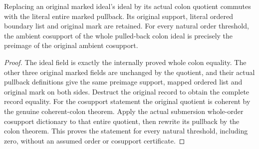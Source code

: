 \begin{theorem}\label{hir:submersion-actual-quotient-marked-record}
\leanok
Replacing an original marked ideal's ideal by its actual colon quotient commutes with the literal entire marked pullback. Its original support, literal ordered boundary list and original mark are retained. For every natural order threshold, the ambient cosupport of the whole pulled-back colon ideal is precisely the preimage of the original ambient cosupport.
\end{theorem}
\begin{proof}
The ideal field is exactly the internally proved whole colon equality. The other three original marked fields are unchanged by the quotient, and their actual pullback definitions give the same preimage support, mapped ordered list and original mark on both sides. Destruct the original record to obtain the complete record equality. For the cosupport statement the original quotient is coherent by the genuine coherent-colon theorem. Apply the actual submersion whole-order cosupport dictionary to that entire quotient, then rewrite its pullback by the colon theorem. This proves the statement for every natural threshold, including zero, without an assumed order or cosupport certificate.
\end{proof}
